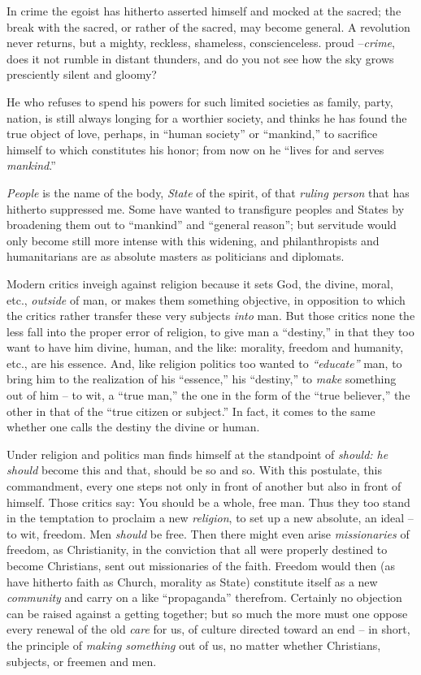 In crime the egoist has hitherto asserted himself and mocked at the sacred; 
the break with the sacred, or rather of the sacred, may become general. A 
revolution never returns, but a mighty, reckless, shameless, conscienceless. 
proud --\textit{crime}, does it not rumble in distant thunders, and do you not 
see how the sky grows presciently silent and gloomy?

\myhrule


He who refuses to spend his powers for such limited societies as family, 
party, nation, is still always longing for a worthier society, and thinks he 
has found the true object of love, perhaps, in ``human society'' or 
``mankind,'' to sacrifice himself to which constitutes his honor; from now 
on he ``lives for and serves \textit{mankind}.''

\textit{People} is the name of the body, \textit{State} of the spirit, of that 
\textit{ruling person} that has hitherto suppressed me. Some have wanted to 
transfigure peoples and States by broadening them out to ``mankind'' and 
``general reason''; but servitude would only become still more intense with 
this widening, and philanthropists and humanitarians are as absolute masters 
as politicians and diplomats.

Modern critics inveigh against religion because it sets God, the divine, 
moral, etc., \textit{outside} of man, or makes them something objective, in 
opposition to which the critics rather transfer these very subjects 
\textit{into} man. But those critics none the less fall into the proper error 
of religion, to give man a ``destiny,'' in that they too want to have him 
divine, human, and the like: morality, freedom and humanity, etc., are his 
essence. And, like religion politics too wanted to \textit{``educate''} man, 
to bring him to the realization of his ``essence,'' his ``destiny,'' to 
\textit{make} something out of him -- to wit, a ``true man,'' the one in the 
form of the ``true believer,'' the other in that of the ``true citizen or 
subject.'' In fact, it comes to the same whether one calls the destiny the 
divine or human.

Under religion and politics man finds himself at the standpoint of 
\textit{should: he should} become this and that, should be so and so. With 
this postulate, this commandment, every one steps not only in front of another 
but also in front of himself. Those critics say: You should be a whole, free 
man. Thus they too stand in the temptation to proclaim a new 
\textit{religion}, to set up a new absolute, an ideal -- to wit, freedom. Men 
\textit{should} be free. Then there might even arise \textit{missionaries} of 
freedom, as Christianity, in the conviction that all were properly destined to 
become Christians, sent out missionaries of the faith. Freedom would then (as 
have hitherto faith as Church, morality as State) constitute itself as a new 
\textit{community} and carry on a like ``propaganda'' therefrom. Certainly 
no objection can be raised against a getting together; but so much the more 
must one oppose every renewal of the old \textit{care} for us, of culture 
directed toward an end -- in short, the principle of \textit{making something} 
out of us, no matter whether Christians, subjects, or freemen and men.


